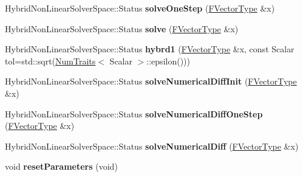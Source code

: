\begin{DoxyCompactItemize}
Hybrid\+Non\+Linear\+Solver\+Space\+::\+Status {\bfseries solve\+One\+Step} (\hyperlink{group___core___module}{F\+Vector\+Type} \&x)
\item 
\mbox{\label{class_eigen_1_1_hybrid_non_linear_solver_a4e1cfd23e2ee4c7e16ed0fd353b3807e}} 
Hybrid\+Non\+Linear\+Solver\+Space\+::\+Status {\bfseries solve} (\hyperlink{group___core___module}{F\+Vector\+Type} \&x)
\item 
\mbox{\label{class_eigen_1_1_hybrid_non_linear_solver_ac901db3e3eacb7f17537d40e6703d1e4}} 
Hybrid\+Non\+Linear\+Solver\+Space\+::\+Status {\bfseries hybrd1} (\hyperlink{group___core___module}{F\+Vector\+Type} \&x, const Scalar tol=std\+::sqrt(\hyperlink{group___core___module_struct_eigen_1_1_num_traits}{Num\+Traits}$<$ Scalar $>$\+::epsilon()))
\item 
\mbox{\label{class_eigen_1_1_hybrid_non_linear_solver_a03e013471915c4395578affbd2e29e26}} 
Hybrid\+Non\+Linear\+Solver\+Space\+::\+Status {\bfseries solve\+Numerical\+Diff\+Init} (\hyperlink{group___core___module}{F\+Vector\+Type} \&x)
\item 
\mbox{\label{class_eigen_1_1_hybrid_non_linear_solver_a73ce76462a048e23cdfcd18c18bd187b}} 
Hybrid\+Non\+Linear\+Solver\+Space\+::\+Status {\bfseries solve\+Numerical\+Diff\+One\+Step} (\hyperlink{group___core___module}{F\+Vector\+Type} \&x)
\item 
\mbox{\label{class_eigen_1_1_hybrid_non_linear_solver_a019c209d3c67020247583dce00a5e760}} 
Hybrid\+Non\+Linear\+Solver\+Space\+::\+Status {\bfseries solve\+Numerical\+Diff} (\hyperlink{group___core___module}{F\+Vector\+Type} \&x)
\item 
\mbox{\label{class_eigen_1_1_hybrid_non_linear_solver_a08b1a535646ff113b502b495594782bc}} 
void {\bfseries reset\+Parameters} (void)
\end{DoxyCompactItemize}
